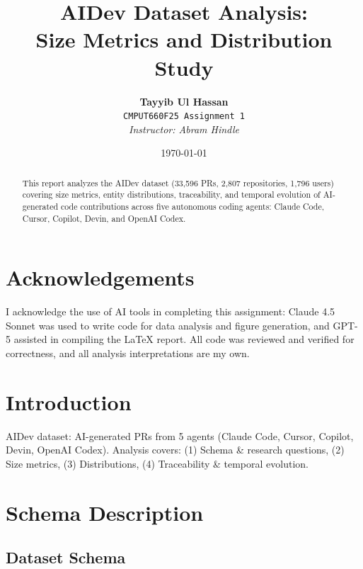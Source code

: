 \documentclass[11pt]{article}
\title{\textbf{AIDev Dataset Analysis:\\Size Metrics and Distribution Study}}
\author{
    \textbf{Tayyib Ul Hassan}\\
    \texttt{CMPUT660F25 Assignment 1}\\[0.5em]
    \textit{Instructor: Abram Hindle}
}
\date{\today}
\begin{document}
\maketitle

\begin{abstract}
This report analyzes the AIDev dataset (33,596 PRs, 2,807 repositories, 1,796 users) covering size metrics, entity distributions, traceability, and temporal evolution of AI-generated code contributions across five autonomous coding agents: Claude Code, Cursor, Copilot, Devin, and OpenAI Codex.
\end{abstract}

\tableofcontents
\newpage

\section*{Acknowledgements}

I acknowledge the use of AI tools in completing this assignment: Claude 4.5 Sonnet was used to write code for data analysis and figure generation, and GPT-5 assisted in compiling the LaTeX report. All code was reviewed and verified for correctness, and all analysis interpretations are my own.

\newpage

\section{Introduction}

AIDev dataset: AI-generated PRs from 5 agents (Claude Code, Cursor, Copilot, Devin, OpenAI Codex). Analysis covers: (1) Schema \& research questions, (2) Size metrics, (3) Distributions, (4) Traceability \& temporal evolution.

\section{Schema Description}

\subsection{Dataset Schema}
\end{document}
